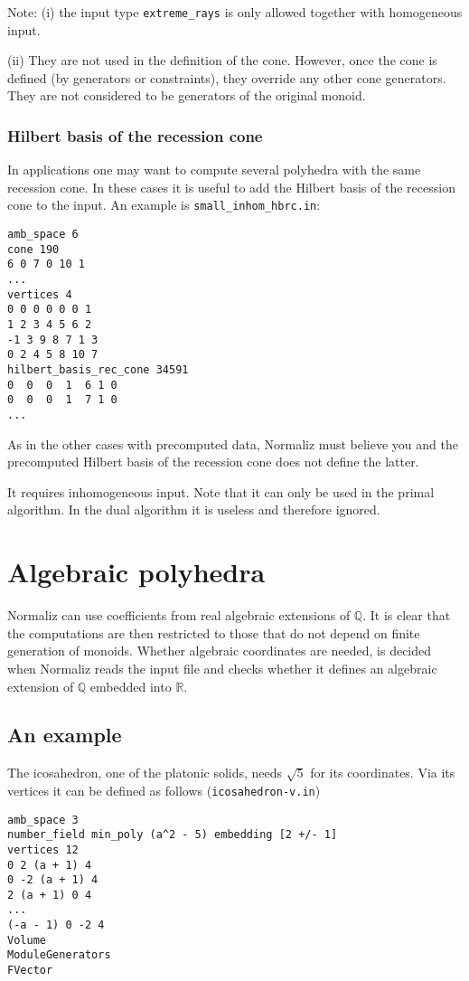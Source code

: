 \documentclass[12pt,a4paper]{scrartcl}
\theoremstyle{definition}
\def\QQ{{\mathbb Q}}
\def\RR{{\mathbb R}}
\begin{document}
{Note: (i) the input type \verb|extreme_rays| is only allowed together with homogeneous input.

(ii) They are not used in the definition of the cone. However, once the cone is defined (by generators or constraints), they override any other cone generators. They are not considered to be generators of the original monoid.

\subsubsection{Hilbert basis of the recession cone}

In applications one may want to compute several polyhedra with the same recession cone. In these cases it is useful to add the Hilbert basis of the recession cone to the input. An example is \verb|small_inhom_hbrc.in|:
\begin{Verbatim}
amb_space 6
cone 190
6 0 7 0 10 1
...
vertices 4
0 0 0 0 0 0 1
1 2 3 4 5 6 2
-1 3 9 8 7 1 3
0 2 4 5 8 10 7
hilbert_basis_rec_cone 34591
0  0  0  1  6 1 0
0  0  0  1  7 1 0
...
\end{Verbatim}
As in the other cases with precomputed data, Normaliz must believe you and the precomputed Hilbert basis of the recession cone does not define the latter.

It requires inhomogeneous input. Note that it can only be used in the primal algorithm. In the dual algorithm it is useless and therefore ignored.  


\section{Algebraic polyhedra} \label{Algebraic}

Normaliz can use coefficients from real algebraic extensions of $\QQ$. It is clear that the computations are then restricted to those that do not depend on finite generation of monoids.  Whether algebraic coordinates are needed, is decided when Normaliz reads the input file and checks whether it defines an algebraic extension of $\QQ$ embedded into $\RR$.

\subsection{An example}\label{alg_ex}

The icosahedron, one of the platonic solids, needs $\sqrt 5$ for its coordinates. Via its vertices it can be defined as follows (\verb|icosahedron-v.in|)
\begin{verbatim}
amb_space 3
number_field min_poly (a^2 - 5) embedding [2 +/- 1]
vertices 12
0 2 (a + 1) 4
0 -2 (a + 1) 4
2 (a + 1) 0 4
...
(-a - 1) 0 -2 4
Volume
ModuleGenerators
FVector
\end{verbatim}

}
\end{document}
